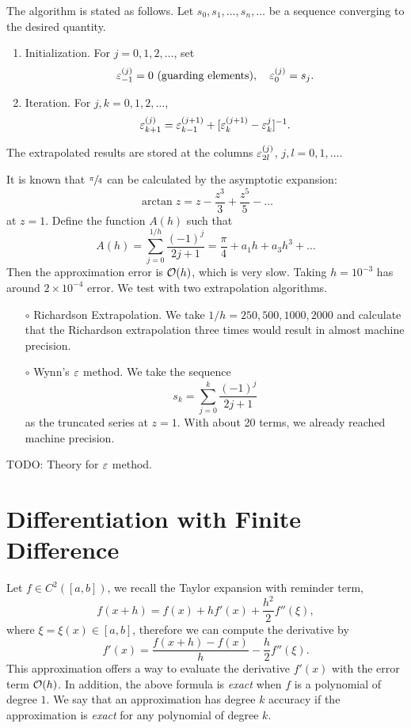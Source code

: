 The algorithm is stated as follows. Let $s_0, s_1, \dots, s_n,\dots$ be a sequence converging to the desired quantity.
\begin{enumerate}
    \item Initialization. For $j = 0, 1, 2,\dots$, set 
    $$\varepsilon_{-1}^{(j)} = 0 \text{ (guarding elements)}, \quad \varepsilon_{0}^{(j)} = s_j.$$
    \item Iteration. For $j,k = 0,1,2,\dots$, 
    $$\varepsilon_{k+1}^{(j)} = \varepsilon_{k-1}^{(j+1)} + [\varepsilon_{k}^{(j+1)} - \varepsilon_{k}^{j}]^{-1}.$$
\end{enumerate}
The extrapolated results are stored at the columns $\varepsilon_{2l}^{(j)}$, $j, l=0,1, \dots$.
\begin{example}
    It is known that $\sfrac{\pi}{4}$ can be calculated by the asymptotic expansion:
    \begin{equation}
        \arctan z = z - \frac{z^3}{3} + \frac{z^5}{5} - \dots 
    \end{equation}
    at $z = 1$. Define the function $A(h)$ such that 
    \begin{equation}
        A(h)= \sum_{j=0}^{1/h} \frac{(-1)^j}{2 j + 1} = \frac{\pi}{4} + a_1 h + a_3 h^3 + \dots
    \end{equation}
    Then the approximation error is $\mathcal O(h)$, which is very slow. Taking $h=10^{-3}$ has around $2\times 10^{-4}$ error.  We test with two extrapolation algorithms.
    \begin{enumerate}
        \item [$\circ$] Richardson Extrapolation. We take $1/h = 250, 500, 1000, 2000$ and calculate that the Richardson extrapolation three times would result in almost machine precision.
        \item [$\circ$] Wynn's $\varepsilon$ method. We take the sequence 
        $$s_k = \sum_{j=0}^k \frac{(-1)^j}{2 j + 1}$$
        as the truncated series at $z = 1$. With about 20 terms, we already reached machine precision.
    \end{enumerate}
\end{example}
\begin{theorem}
    TODO: Theory for $\varepsilon$ method.
\end{theorem}
\section{Differentiation with Finite Difference}
Let $f\in C^2([a, b])$, we recall the Taylor expansion with reminder term, 
\begin{equation}
    f(x + h) = f(x) + h f'(x) + \frac{h^2}{2} f''(\xi),
\end{equation}
where $\xi = \xi(x)\in [a, b]$, therefore we can compute the derivative by 
\begin{equation}
    f'(x)  = \frac{f(x + h) - f(x)}{h} - \frac{h}{2} f''(\xi).
\end{equation}
This approximation offers a way to evaluate the derivative $f'(x)$ with the error term $\mathcal O(h)$. In addition, the above formula is \emph{exact} when $f$ is a polynomial of degree $1$. We say that an approximation has degree $k$ accuracy if the approximation is \emph{exact} for any polynomial of degree $k$. 


